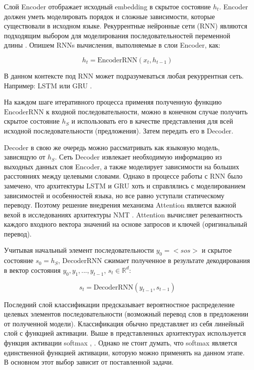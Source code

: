 	Слой Encoder отображает исходный embedding в скрытое состояние $h_t$. Encoder должен уметь моделировать порядок и сложные зависимости, которые существовали в исходном языке. Рекуррентные нейронные сети (RNN) являются подходящим выбором для моделирования последовательностей переменной длины \cite{12}. Опишем RNNs вычисления, выполняемые в слои Encoder, как:
	
	$$
	    h_t = \text{EncoderRNN}(x_t, h_{t-1})
	$$
	
	В данном контексте под RNN может подразумеваться любая рекуррентная сеть. Например: LSTM \cite{2} или GRU \cite{3}.

	На каждом шаге итеративного процесса применяя полученную функцию $\text{EncoderRNN}$ к входной последовательности, можно в конечном случае получить скрытое состояние $h_S$ и использовать его в качестве представления для всей исходной последовательности (предложения). Затем передать его в Decoder.
	
	Decoder в свою же очередь можно рассматривать как языковую модель, зависящую от $h_S$. Сеть Decoder извлекает необходимую информацию из выходных данных слоя Encoder, а также моделирует зависимости на больших расстояниях между целевыми словами. Однако в процессе работы с RNN было замечено, что архитектуры LSTM и GRU хоть и справлялись с моделированием зависимостей и особенностей языка, но все равно уступали статическому переводу. Поэтому решение внедрения механизма Attention является важной вехой в исследованиях архитектуры NMT \cite{16}. Attention вычисляет релевантность каждого входного вектора значений на основе запросов и ключей (оригинальный перевод).
	
	Учитывая начальный элемент последовательности $y_0 = <sos>$ и скрытое состояние $s_0 = h_S$, $\text{DecoderRNN}$ сжимает полученное в результате декодирования в вектор состояния ${y_0, y_1, ... ,y_{t-1}}$, $s_t \in \mathbb{R}^d$:
	
	$$
	    s_t = \text{DecoderRNN}(y_{t-1}, s_{t-1})
	$$
	
	Последний слой классификации предсказывает вероятностное распределение целевых элементов последовательности (возможный перевод слов в предложении от полученной модели). Классификация обычно представляет из себя линейный слой с функцией активации. Выше в представленных архитектурах используется функция активации softmax \cite{3}, \cite{5}. Однако не стоит думать, что softmax является единственной функцией активации, которую можно применять на данном этапе. В основном этот выбор зависит от поставленной задачи. 
	
